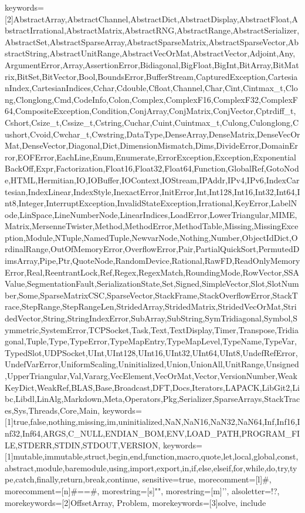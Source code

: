 {    %
    keywords=[2]{AbstractArray,AbstractChannel,AbstractDict,AbstractDisplay,AbstractFloat,AbstractIrrational,AbstractMatrix,AbstractRNG,AbstractRange,AbstractSerializer,AbstractSet,AbstractSparseArray,AbstractSparseMatrix,AbstractSparseVector,AbstractString,AbstractUnitRange,AbstractVecOrMat,AbstractVector,Adjoint,Any,ArgumentError,Array,AssertionError,Bidiagonal,BigFloat,BigInt,BitArray,BitMatrix,BitSet,BitVector,Bool,BoundsError,BufferStream,CapturedException,CartesianIndex,CartesianIndices,Cchar,Cdouble,Cfloat,Channel,Char,Cint,Cintmax_t,Clong,Clonglong,Cmd,CodeInfo,Colon,Complex,ComplexF16,ComplexF32,ComplexF64,CompositeException,Condition,ConjArray,ConjMatrix,ConjVector,Cptrdiff_t,Cshort,Csize_t,Cssize_t,Cstring,Cuchar,Cuint,Cuintmax_t,Culong,Culonglong,Cushort,Cvoid,Cwchar_t,Cwstring,DataType,DenseArray,DenseMatrix,DenseVecOrMat,DenseVector,Diagonal,Dict,DimensionMismatch,Dims,DivideError,DomainError,EOFError,EachLine,Enum,Enumerate,ErrorException,Exception,ExponentialBackOff,Expr,Factorization,Float16,Float32,Float64,Function,GlobalRef,GotoNode,HTML,Hermitian,IO,IOBuffer,IOContext,IOStream,IPAddr,IPv4,IPv6,IndexCartesian,IndexLinear,IndexStyle,InexactError,InitError,Int,Int128,Int16,Int32,Int64,Int8,Integer,InterruptException,InvalidStateException,Irrational,KeyError,LabelNode,LinSpace,LineNumberNode,LinearIndices,LoadError,LowerTriangular,MIME,Matrix,MersenneTwister,Method,MethodError,MethodTable,Missing,MissingException,Module,NTuple,NamedTuple,NewvarNode,Nothing,Number,ObjectIdDict,OrdinalRange,OutOfMemoryError,OverflowError,Pair,PartialQuickSort,PermutedDimsArray,Pipe,Ptr,QuoteNode,RandomDevice,Rational,RawFD,ReadOnlyMemoryError,Real,ReentrantLock,Ref,Regex,RegexMatch,RoundingMode,RowVector,SSAValue,SegmentationFault,SerializationState,Set,Signed,SimpleVector,Slot,SlotNumber,Some,SparseMatrixCSC,SparseVector,StackFrame,StackOverflowError,StackTrace,StepRange,StepRangeLen,StridedArray,StridedMatrix,StridedVecOrMat,StridedVector,String,StringIndexError,SubArray,SubString,SymTridiagonal,Symbol,Symmetric,SystemError,TCPSocket,Task,Text,TextDisplay,Timer,Transpose,Tridiagonal,Tuple,Type,TypeError,TypeMapEntry,TypeMapLevel,TypeName,TypeVar,TypedSlot,UDPSocket,UInt,UInt128,UInt16,UInt32,UInt64,UInt8,UndefRefError,UndefVarError,UniformScaling,Uninitialized,Union,UnionAll,UnitRange,Unsigned,UpperTriangular,Val,Vararg,VecElement,VecOrMat,Vector,VersionNumber,WeakKeyDict,WeakRef,BLAS,Base,Broadcast,DFT,Docs,Iterators,LAPACK,LibGit2,Libc,Libdl,LinAlg,Markdown,Meta,Operators,Pkg,Serializer,SparseArrays,StackTraces,Sys,Threads,Core,Main},%
    keywords=[1]{true,false,nothing,missing,im,uninitialized,NaN,NaN16,NaN32,NaN64,Inf,Inf16,Inf32,Inf64,ARGS,C_NULL,ENDIAN_BOM,ENV,LOAD_PATH,PROGRAM_FILE,STDERR,STDIN,STDOUT,VERSION},
    keywords=[1]{mutable,immutable,struct,begin,end,function,macro,quote,let,local,global,const,abstract,module,baremodule,using,import,export,in,if,else,elseif,for,while,do,try,type,catch,finally,return,break,continue},%
    sensitive=true,
    morecomment=[l]{\#},
    morecomment=[n]{\#=}{=\#},
    morestring=[s]{"}{"},
    morestring=[m]{'}{'},
    alsoletter=!?,
    morekeywords=[2]{OffsetArray, Problem},
    morekeywords=[3]{solve, include}
}


